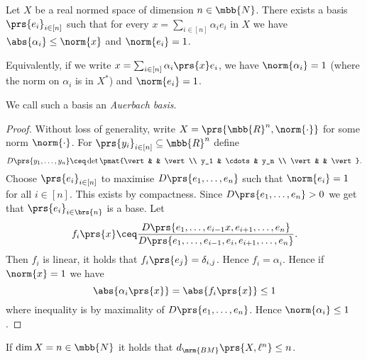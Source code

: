 \documentclass[10pt, twoside]{book}
\begin{document}
\begin{theorem}[Auerbach]
Let $X$ be a real normed space of dimension $n \in \mbb{N}$. There exists a basis $\prs{e_i}_{i \in [n]}$ such that for every $x = \sum_{i \in [n]} \alpha_i e_i$ in $X$ we have $\abs{\alpha_i} \leq \norm{x}$ and $\norm{e_i} = 1$.

Equivalently, if we write $x = \sum_{i \in [n]} \alpha_i\prs{x} e_i$, we have $\norm{\alpha_i} = 1$ (where the norm on $\alpha_i$ is in $X^*$) and $\norm{e_i} = 1$.

We call such a basis an \emph{Auerbach basis}.
\end{theorem}

\begin{proof}
Without loss of generality, write $X = \prs{\mbb{R}^n, \norm{\cdot}}$ for some norm $\norm{\cdot}$. For $\prs{y_i}_{i \in [n]} \subseteq \mbb{R}^n$ define
\[D\prs{y_1, \ldots, y_n} \ceq \det \pmat{\vert & & \vert \\ y_1 & \cdots & y_n \\ \vert & & \vert} \text{.}\]
Choose $\prs{e_i}_{i \in [n]}$ to maximise $D\prs{e_1, \ldots, e_n}$ such that $\norm{e_i} = 1$ for all $i \in [n]$. This exists by compactness.
Since $D\prs{e_1, \ldots, e_n} > 0$ we get that $\prs{e_i}_{i \in \brs{n}}$ is a base.
Let
\[f_i\prs{x} \ceq \frac{D\prs{e_1, \ldots, e_{i-1} x, e_{i+1}, \ldots, e_n}}{D\prs{e_1, \ldots, e_{i-1}, e_i, e_{i+1}, \ldots, e_n}} \text{.}\]
Then $f_i$ is linear, it holds that $f_i\prs{e_j} = \delta_{i,j}$.
Hence $f_i = \alpha_i$. Hence if $\norm{x} = 1$ we have
\[\abs{\alpha_i\prs{x}} = \abs{f_i\prs{x}} \leq 1\]
where inequality is by maximality of $D\prs{e_1, \ldots, e_n}$.
Hence $\norm{\alpha_i} \leq 1$.
\end{proof}

\begin{corollary}
If $\dim X = n \in \mbb{N}$ it holds that $d_{\mrm{BM}}\prs{X, \ell^n} \leq n$.
\end{corollary}
\end{document}
